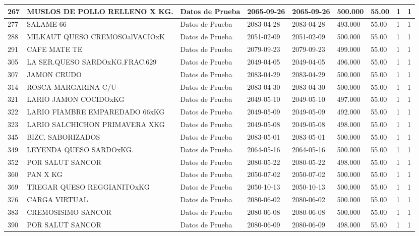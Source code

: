 \documentclass[a4paper,12pt]{article}
\begin{document}
\begin{landscape}
\begin{longtable}{|p{4cm}|p{2.5cm}|p{2.5cm}|p{1.8cm}|p{1.8cm}|p{1cm}|p{1cm}|p{3cm}|p{3cm}||}
267 & MUSLOS DE POLLO RELLENO X KG. & Datos de Prueba & 2065-09-26 & 2065-09-26 & 500.000 & 55.00 & 1 & 1 \\ \hline 
277 & SALAME 66 & Datos de Prueba & 2083-04-28 & 2083-04-28 & 493.000 & 55.00 & 1 & 1 \\ \hline 
288 & MILKAUT QUESO CREMOSOalVACIOxK & Datos de Prueba & 2051-02-09 & 2051-02-09 & 500.000 & 55.00 & 1 & 1 \\ \hline 
291 & CAFE MATE TE & Datos de Prueba & 2079-09-23 & 2079-09-23 & 499.000 & 55.00 & 1 & 1 \\ \hline 
305 & LA SER.QUESO SARDOxKG.FRAC.629 & Datos de Prueba & 2049-04-05 & 2049-04-05 & 496.000 & 55.00 & 1 & 1 \\ \hline 
307 & JAMON CRUDO & Datos de Prueba & 2083-04-29 & 2083-04-29 & 500.000 & 55.00 & 1 & 1 \\ \hline 
314 & ROSCA MARGARINA C/U & Datos de Prueba & 2083-04-30 & 2083-04-30 & 500.000 & 55.00 & 1 & 1 \\ \hline 
321 & LARIO JAMON COCIDOxKG & Datos de Prueba & 2049-05-10 & 2049-05-10 & 497.000 & 55.00 & 1 & 1 \\ \hline 
322 & LARIO FIAMBRE EMPAREDADO 66xKG & Datos de Prueba & 2049-05-09 & 2049-05-09 & 492.000 & 55.00 & 1 & 1 \\ \hline 
323 & LARIO SALCHICHON PRIMAVERA XKG & Datos de Prueba & 2049-05-08 & 2049-05-08 & 498.000 & 55.00 & 1 & 1 \\ \hline 
345 & BIZC. SABORIZADOS & Datos de Prueba & 2083-05-01 & 2083-05-01 & 500.000 & 55.00 & 1 & 1 \\ \hline 
349 & LEYENDA QUESO SARDOxKG. & Datos de Prueba & 2064-05-16 & 2064-05-16 & 500.000 & 55.00 & 1 & 1 \\ \hline 
352 & POR SALUT SANCOR & Datos de Prueba & 2080-05-22 & 2080-05-22 & 498.000 & 55.00 & 1 & 1 \\ \hline 
360 & PAN X KG & Datos de Prueba & 2050-07-02 & 2050-07-02 & 500.000 & 55.00 & 1 & 1 \\ \hline 
369 & TREGAR QUESO REGGIANITOxKG & Datos de Prueba & 2050-10-13 & 2050-10-13 & 500.000 & 55.00 & 1 & 1 \\ \hline 
376 & CARGA VIRTUAL & Datos de Prueba & 2080-06-02 & 2080-06-02 & 500.000 & 55.00 & 1 & 1 \\ \hline 
383 & CREMOSISIMO SANCOR & Datos de Prueba & 2080-06-08 & 2080-06-08 & 500.000 & 55.00 & 1 & 1 \\ \hline 
390 & POR SALUT SANCOR & Datos de Prueba & 2080-06-09 & 2080-06-09 & 498.000 & 55.00 & 1 & 1 \\ \hline 

\end{longtable}
\end{landscape}
\end{document}
